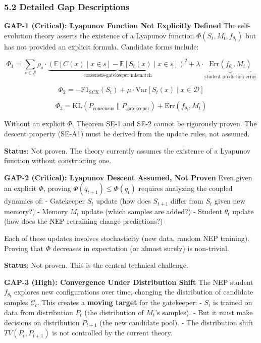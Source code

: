 \documentclass[
  12pt,
]{article}
\begin{document}
\subsubsection{5.2 Detailed Gap
Descriptions}\label{detailed-gap-descriptions}

\textbf{GAP-1 (Critical): Lyapunov Function Not Explicitly Defined} The
self-evolution theory asserts the existence of a Lyapunov function
\(\Phi(S_t, M_t, f_{\theta_t})\) but has not provided an explicit
formula. Candidate forms include:

\[\Phi_1 = \sum_{s \in \mathcal{S}} \rho_s \cdot \underbrace{(\mathbb{E}[C(x) \mid x \in s] - \mathbb{E}[S_t(x) \mid x \in s])^2}_{\text{consensus-gatekeeper mismatch}} + \lambda \cdot \underbrace{\text{Err}(f_{\theta_t}, M_t)}_{\text{student prediction error}}\]

\[\Phi_2 = -\text{F1}_{\text{SCX}}(S_t) + \mu \cdot \text{Var}[S_t(x) \mid x \in \mathcal{D}]\]

\[\Phi_3 = \text{KL}(P_{\text{consensus}} \| P_{\text{gatekeeper}}) + \text{Err}(f_{\theta_t}, M_t)\]

Without an explicit \(\Phi\), Theorem SE-1 and SE-2 cannot be rigorously
proven. The descent property (SE-A1) must be derived from the update
rules, not assumed.

\textbf{Status}: Not proven. The theory currently assumes the existence
of a Lyapunov function without constructing one.

\textbf{GAP-2 (Critical): Lyapunov Descent Assumed, Not Proven} Even
given an explicit \(\Phi\), proving \(\Phi(q_{t+1}) \leq \Phi(q_t)\)
requires analyzing the coupled dynamics of: - Gatekeeper \(S_t\) update
(how does \(S_{t+1}\) differ from \(S_t\) given new memory?) - Memory
\(M_t\) update (which samples are added?) - Student \(\theta_t\) update
(how does the NEP retraining change predictions?)

Each of these updates involves stochasticity (new data, random NEP
training). Proving that \(\Phi\) decreases in expectation (or almost
surely) is non-trivial.

\textbf{Status}: Not proven. This is the central technical challenge.

\textbf{GAP-3 (High): Convergence Under Distribution Shift} The NEP
student \(f_{\theta_t}\) explores new configurations over time, changing
the distribution of candidate samples \(\mathcal{C}_t\). This creates a
\textbf{moving target} for the gatekeeper: - \(S_t\) is trained on data
from distribution \(P_t\) (the distribution of \(M_t\)'s samples). - But
it must make decisions on distribution \(P_{t+1}\) (the new candidate
pool). - The distribution shift \(TV(P_t, P_{t+1})\) is not controlled
by the current theory.
\end{document}

